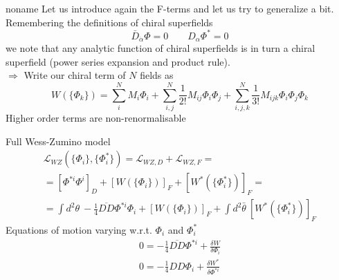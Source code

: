 \documentclass[10pt]{beamer}
\begin{document}
\begin{frame}{noname}
    Let us introduce again the F-terms and let us try to generalize a bit.
    Remembering the definitions of chiral superfields 
    \begin{equation*}
        \bar D_{\dot\alpha} \Phi = 0 \qquad D_{\alpha} \Phi^* = 0
    \end{equation*}
        we note that any analytic function of chiral superfields is in turn a chiral superfield (power series expansion and product rule). \\
        $\Rightarrow$ Write our chiral term of $N$ fields as 
        \begin{equation*}
            W(\{\Phi_k\}) = \sum_i^N M_i \Phi_i + \sum_{i,j}^N \frac{1}{2!} M_{ij} \Phi_{i}\Phi_j + \sum_{i,j,k}^N \frac{1}{3!} M_{ijk} \Phi_i \Phi_j \Phi_k
        \end{equation*}
        Higher order terms are non-renormalisable 
    
\end{frame}

\begin{frame}{Full Wess-Zumino model}
\begin{gather*}
\mathcal{L}_{WZ}\left(\{\Phi_i\}, \{\Phi^*_i\}\right) = \mathcal{L}_{WZ,D} + \mathcal{L}_{WZ,F} = \\
= \left[\Phi^{*i}\Phi^i\right]_D + \left[W(\{\Phi_i\})\right]_F +  \left[W^*(\{\Phi^*_i\})\right]_F = \\
= \boxed{\int d^2\theta \ -\frac{1}{4}\overline{DD}\Phi^{*i}\Phi_i + \left[W(\{\Phi_i\})\right]_F + \int d^2\bar\theta \ \left[W^*(\{\Phi^*_i\})\right]_F}
\end{gather*}
Equations of motion varying w.r.t. $\Phi_i$ and $\Phi_i^*$
\begin{gather*}
    0=-\frac{1}{4} \overline{D D} \Phi^{* i}+\frac{\delta W}{\delta \Phi_{i}} \\
    0=-\frac{1}{4} D D \Phi_{i}+\frac{\delta W^{*}}{\delta \Phi^{* i}}
\end{gather*}
\end{frame}
    
\end{document}
